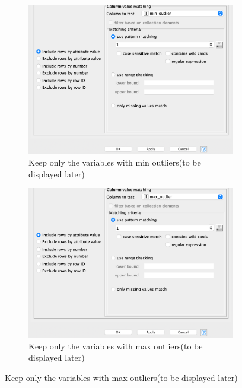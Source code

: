 \documentclass[11pt]{article}
\begin{document}
\begin{figure}[H]
\begin{subfigure}{0.4\textwidth}
						\includegraphics[width=\textwidth]{res/t0/t03/t03-min-outliers-filter-conf}
						\caption{Keep only the variables with min outliers(to be displayed later)}
						\label{fig:first}
					\end{subfigure}
					\hfill
					\begin{subfigure}{0.4\textwidth}
						\includegraphics[width=\textwidth]{res/t0/t03/t03-max-outliers-filter-conf}
						\caption{Keep only the variables with max outliers(to be displayed later)}
						\label{fig:second}
					\end{subfigure}
					\hfill
				\end{figure}
				\fi
			
\end{document}
